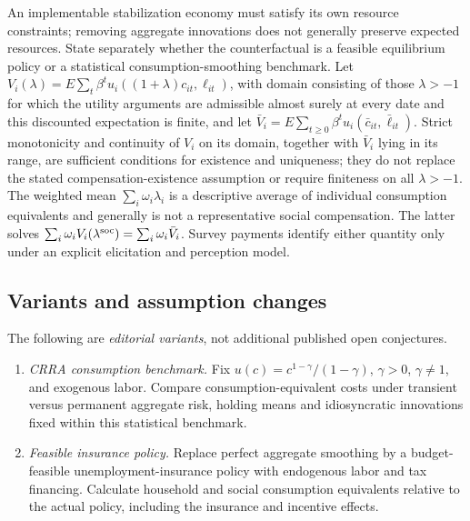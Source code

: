 \documentclass[11pt,a4paper]{article}
\begin{document}
An implementable stabilization economy must satisfy its own resource constraints; removing aggregate innovations does not generally preserve expected resources. State separately whether the counterfactual is a feasible equilibrium policy or a statistical consumption-smoothing benchmark. Let \(V_i(\lambda)=E\sum_t\beta^tu_i((1+\lambda)c_{it},\ell_{it})\), with domain consisting of those \(\lambda>-1\) for which the utility arguments are admissible almost surely at every date and this discounted expectation is finite, and let \(\bar V_i=E\sum_{t\ge0}\beta^t u_i(\bar c_{it},\bar\ell_{it})\). Strict monotonicity and continuity of \(V_i\) on its domain, together with \(\bar V_i\) lying in its range, are sufficient conditions for existence and uniqueness; they do not replace the stated compensation-existence assumption or require finiteness on all \(\lambda>-1\). The weighted mean \(\sum_i\omega_i\lambda_i\) is a descriptive average of individual consumption equivalents and generally is not a representative social compensation. The latter solves \(\sum_i\omega_iV_i(\lambda^{\rm soc})=\sum_i\omega_i\bar V_i\). Survey payments identify either quantity only under an explicit elicitation and perception model.
\subsection*{Variants and assumption changes}
The following are \emph{editorial variants}, not additional published open conjectures.
\begin{enumerate}
\item \emph{CRRA consumption benchmark.} Fix \(u(c)=c^{1-\gamma}/(1-\gamma)\), \(\gamma>0\), \(\gamma\ne1\), and exogenous labor. Compare consumption-equivalent costs under transient versus permanent aggregate risk, holding means and idiosyncratic innovations fixed within this statistical benchmark.
\item \emph{Feasible insurance policy.} Replace perfect aggregate smoothing by a budget-feasible unemployment-insurance policy with endogenous labor and tax financing. Calculate household and social consumption equivalents relative to the actual policy, including the insurance and incentive effects.
\end{enumerate}
\end{document}
